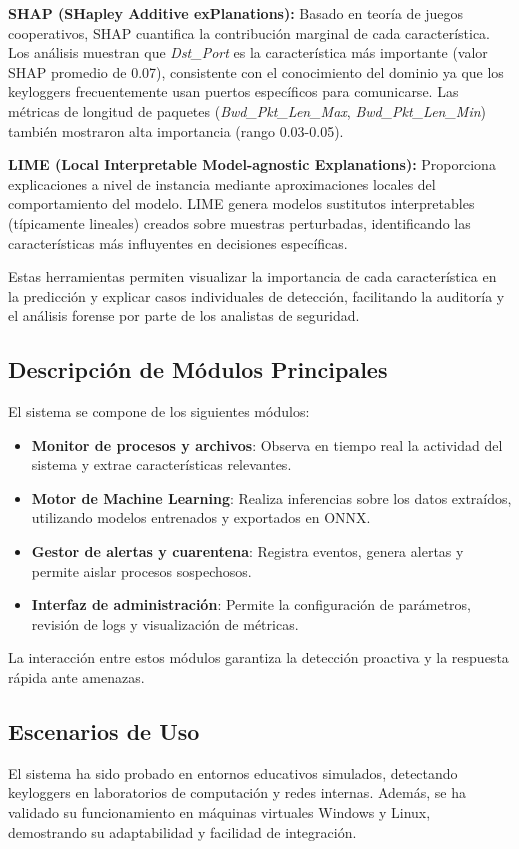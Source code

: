 \documentclass[conference]{IEEEtran}
\begin{document}
\textbf{SHAP (SHapley Additive exPlanations):}
Basado en teoría de juegos cooperativos, SHAP cuantifica la contribución marginal de cada característica. Los análisis muestran que \textit{Dst\_Port} es la característica más importante (valor SHAP promedio de 0.07), consistente con el conocimiento del dominio ya que los keyloggers frecuentemente usan puertos específicos para comunicarse. Las métricas de longitud de paquetes (\textit{Bwd\_Pkt\_Len\_Max}, \textit{Bwd\_Pkt\_Len\_Min}) también mostraron alta importancia (rango 0.03-0.05).

\textbf{LIME (Local Interpretable Model-agnostic Explanations):}
Proporciona explicaciones a nivel de instancia mediante aproximaciones locales del comportamiento del modelo. LIME genera modelos sustitutos interpretables (típicamente lineales) creados sobre muestras perturbadas, identificando las características más influyentes en decisiones específicas.

Estas herramientas permiten visualizar la importancia de cada característica en la predicción y explicar casos individuales de detección, facilitando la auditoría y el análisis forense por parte de los analistas de seguridad.

\subsection{Descripción de Módulos Principales}
El sistema se compone de los siguientes módulos:
\begin{itemize}
    \item \textbf{Monitor de procesos y archivos}: Observa en tiempo real la actividad del sistema y extrae características relevantes.
    \item \textbf{Motor de Machine Learning}: Realiza inferencias sobre los datos extraídos, utilizando modelos entrenados y exportados en ONNX.
    \item \textbf{Gestor de alertas y cuarentena}: Registra eventos, genera alertas y permite aislar procesos sospechosos.
    \item \textbf{Interfaz de administración}: Permite la configuración de parámetros, revisión de logs y visualización de métricas.
\end{itemize}

La interacción entre estos módulos garantiza la detección proactiva y la respuesta rápida ante amenazas.

\subsection{Escenarios de Uso}
El sistema ha sido probado en entornos educativos simulados, detectando keyloggers en laboratorios de computación y redes internas. Además, se ha validado su funcionamiento en máquinas virtuales Windows y Linux, demostrando su adaptabilidad y facilidad de integración.
\end{document}
